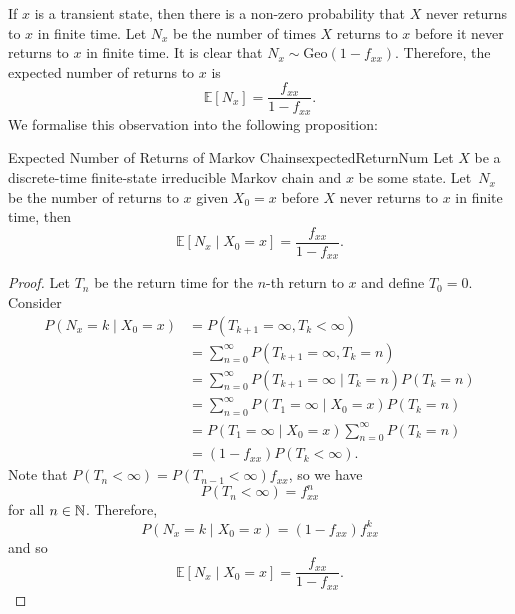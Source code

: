 \documentclass[math, code]{amznotes}
\theoremstyle{remark}
\begin{document}
If $x$ is a transient state, then there is a non-zero probability that $X$ never returns to $x$ in finite time. Let $N_x$ be the number of times $X$ returns to $x$ before it never returns to $x$ in finite time. It is clear that $N_x \sim \mathrm{Geo}\left(1 - f_{xx}\right)$. Therefore, the expected number of returns to $x$ is 
\begin{equation*}
    \mathbb{E}\left[N_x\right] = \frac{f_{xx}}{1 - f_{xx}}.
\end{equation*}
We formalise this observation into the following proposition:
\begin{probox}{Expected Number of Returns of Markov Chains}{expectedReturnNum}
    Let $X$ be a discrete-time finite-state irreducible Markov chain and $x$ be some state. Let~$N_x$ be the number of returns to $x$ given $X_0 = x$ before $X$ never returns to $x$ in finite time, then 
    \begin{equation*}
        \mathbb{E}\left[N_x \mid X_0 = x\right] = \frac{f_{xx}}{1 - f_{xx}}.
    \end{equation*}
    \tcblower
    \begin{proof}
        Let $T_n$ be the return time for the $n$-th return to $x$ and define $T_0 = 0$. Consider 
        \begin{align*}
            P\left(N_x = k \mid X_0 = x\right) & = P\left(T_{k + 1} = \infty, T_{k} < \infty\right) \\
            & = \sum_{n = 0}^{\infty}P\left(T_{k + 1} = \infty, T_{k} = n\right) \\
            & = \sum_{n = 0}^{\infty}P\left(T_{k + 1} = \infty \mid T_{k} = n\right)P\left(T_{k} = n\right) \\
            & = \sum_{n = 0}^{\infty}P\left(T_1 = \infty \mid X_0 = x\right)P\left(T_{k} = n\right) \\
            & = P\left(T_1 = \infty \mid X_0 = x\right)\sum_{n = 0}^{\infty}P\left(T_{k} = n\right) \\
            & = \left(1 - f_{xx}\right)P\left(T_{k} < \infty\right).
        \end{align*}
        Note that $P\left(T_n < \infty\right) = P\left(T_{n - 1} < \infty\right)f_{xx}$, so we have 
        \begin{equation*}
            P\left(T_n < \infty\right) = f_{xx}^n
        \end{equation*}
        for all $n \in \mathbb{N}$. Therefore, 
        \begin{equation*}
            P\left(N_x = k \mid X_0 = x\right) = \left(1 - f_{xx}\right)f_{xx}^{k}
        \end{equation*}
        and so 
        \begin{equation*}
            \mathbb{E}\left[N_x \mid X_0 = x\right] = \frac{f_{xx}}{1 - f_{xx}}.
        \end{equation*}
    \end{proof}
\end{probox}
\end{document}
